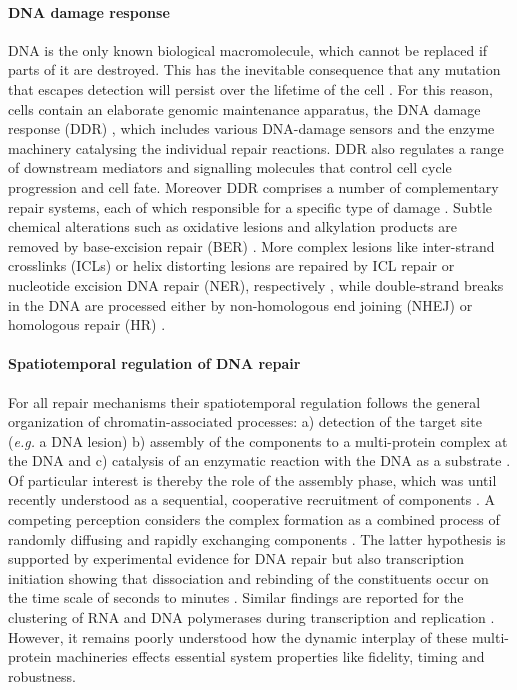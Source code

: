 \paragraph{DNA damage response}
\label{sec:intro_DDR}    
DNA is the only known biological macromolecule, which cannot be replaced if parts of it are destroyed. This has the inevitable consequence that any mutation that escapes detection will persist over the lifetime of the cell \cite{Hoeijmakers2009,Marteijn2014}. For this reason, cells contain an elaborate genomic maintenance apparatus, the DNA damage response (DDR) \cite{Ciccia2010}, which includes various DNA-damage sensors and the enzyme machinery catalysing the individual repair reactions. DDR also regulates a range of downstream mediators and signalling molecules that control cell cycle progression and cell fate. Moreover DDR comprises a number of complementary repair systems, each of which responsible for a specific type of damage \cite{Ciccia2010,Marteijn2014}. Subtle chemical alterations such as oxidative lesions and alkylation products are removed by base-excision repair (BER) \cite{Lindahl2000,Caldecott2008}. More complex lesions like inter-strand crosslinks (ICLs) or helix distorting lesions are repaired by ICL repair or nucleotide excision DNA repair (NER), respectively \cite{Moldovan2009,Hoeijmakers2009}, while double-strand breaks in the DNA are processed either by non-homologous end joining (NHEJ) or homologous repair (HR) \cite{Caldecott2008,West2003}. 

\paragraph{Spatiotemporal regulation of DNA repair}
\label{sec:intro_reg_repair} 
For all repair mechanisms their spatiotemporal regulation follows the general organization of chromatin-associated processes: a) detection of the target site (\textit{e.g.} a DNA lesion) b) assembly of the components to a multi-protein complex at the DNA and c) catalysis of an enzymatic reaction with the DNA as a substrate \cite{Hoeijmakers:2001:Nature:11357144,Gillet:2006:Chem-Rev:16464005,Dinant:2009:J-Cell-Biol:19332890,Luijsterburg2010}. Of particular interest is thereby the role of the assembly phase, which was until recently understood as a sequential, cooperative recruitment of components \cite{Volker2001}. A competing perception considers the complex formation as a combined process of randomly diffusing and rapidly exchanging components \cite{Luijsterburg2010}. The latter hypothesis is supported by experimental evidence for DNA repair but also transcription initiation showing that dissociation and rebinding of the constituents occur on the time scale of seconds to minutes \cite{Vermeulen2011,Stasevich2011}. Similar findings are reported for the clustering of RNA and DNA polymerases during transcription and replication \cite{Kuipers2011,Sonneville2012}. However, it remains poorly understood how the dynamic interplay of these multi-protein machineries effects essential system properties like fidelity, timing and robustness. 




